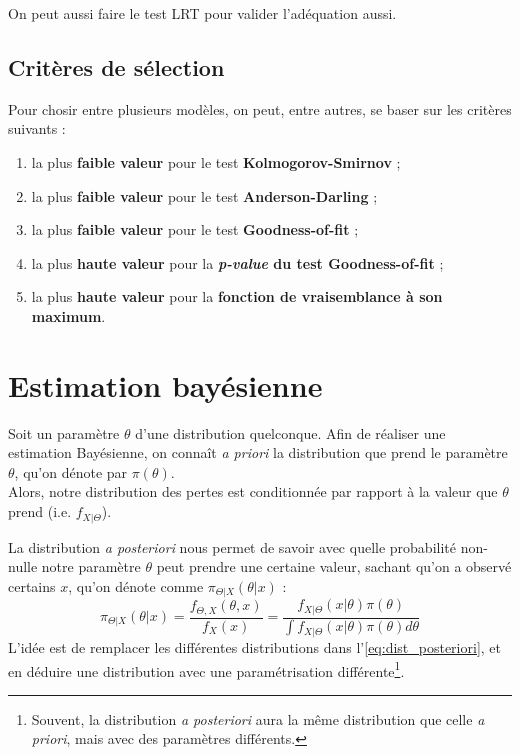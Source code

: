 \documentclass[french, landscape]{article}
\begin{document}
\begin{multicols*}{3}
On peut aussi faire le test LRT pour valider l'adéquation aussi.

\subsection*{Critères de sélection}
Pour chosir entre plusieurs modèles, on peut, entre autres, se baser sur les critères suivants : 
\begin{enumerate}
\item la plus \textbf{faible valeur} pour le test \textbf{Kolmogorov-Smirnov} ; 
\item  la plus \textbf{faible valeur} pour le test \textbf{Anderson-Darling} ;
\item  la plus \textbf{faible valeur} pour le test \textbf{Goodness-of-fit} ;
\item la plus \textbf{haute valeur} pour la \textbf{\emph{p-value} du test Goodness-of-fit} ; 
\item la plus \textbf{haute valeur} pour la \textbf{fonction de vraisemblance à son maximum}.
\end{enumerate}

\section{Estimation bayésienne}
\begin{definition}
Soit un paramètre $\theta$ d'une distribution quelconque. Afin de réaliser une estimation Bayésienne, on connaît \emph{a priori} la distribution que prend le paramètre $\theta$, qu'on dénote par $\pi(\theta)$. \\

Alors, notre distribution des pertes est conditionnée par rapport à la valeur que $\theta$ prend (i.e. $f_{X|\Theta}$).
\end{definition}


\begin{definition}
La distribution \emph{a posteriori} nous permet de savoir avec quelle probabilité non-nulle notre paramètre $\theta$ peut prendre une certaine valeur, sachant qu'on a observé certains $x$, qu'on dénote comme $\pi_{\Theta | X}(\theta | x)$ : 
\begin{equation}
\label{eq:dist_posteriori}
\pi_{\Theta | X}(\theta | x) = \frac{f_{\Theta, X}(\theta, x)}{f_{X}(x)} = \frac{f_{X|\Theta}(x | \theta) \pi(\theta)}{\int f_{X|\Theta}(x | \theta) \pi(\theta) d \theta} 
\end{equation}
L'idée est de remplacer les différentes distributions dans l'\autoref{eq:dist_posteriori}, et en déduire une distribution avec une paramétrisation différente\footnote{Souvent, la distribution \emph{a posteriori} aura la même distribution que celle \emph{a priori}, mais avec des paramètres différents.}.
\end{definition}


\end{multicols*}
\end{document}
